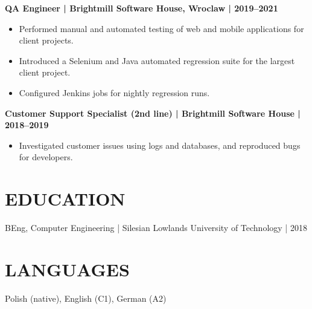 \documentclass[11pt,a4paper]{article}
\begin{document}
\textbf{QA Engineer | Brightmill Software House, Wroclaw | 2019--2021}
\begin{itemize}
\item Performed manual and automated testing of web and mobile applications for client projects.
\item Introduced a Selenium and Java automated regression suite for the largest client project.
\item Configured Jenkins jobs for nightly regression runs.
\end{itemize}

\textbf{Customer Support Specialist (2nd line) | Brightmill Software House | 2018--2019}
\begin{itemize}
\item Investigated customer issues using logs and databases, and reproduced bugs for developers.
\end{itemize}

\section*{EDUCATION}
BEng, Computer Engineering | Silesian Lowlands University of Technology | 2018

\section*{LANGUAGES}
Polish (native), English (C1), German (A2)
\end{document}
